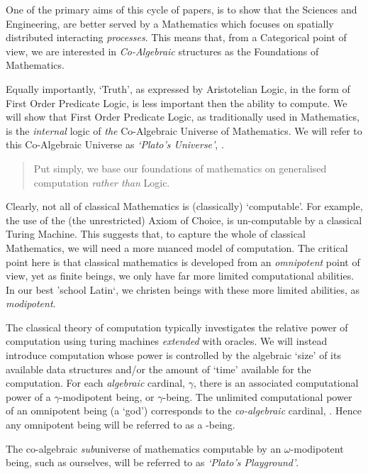 \documentclass[a4paper,openany]{amsbook}
\newenvironment{myQuote}{\begin{quotation}}{\end{quotation}}
\begin{document}
One of the primary aims of this cycle of papers, is to show that the Sciences
and Engineering, are better served by a Mathematics which focuses on spatially
distributed interacting \emph{processes}. This means that, from a Categorical
point of view, we are interested in \emph{Co-Algebraic} structures as the
Foundations of Mathematics.

Equally importantly, `Truth', as expressed by Aristotelian Logic, in the form of
First Order Predicate Logic, is less important then the ability to compute. We
will show that First Order Predicate Logic, as traditionally used in
Mathematics, is the \emph{internal} logic of \emph{the} Co-Algebraic Universe of
Mathematics. We will refer to this Co-Algebraic Universe as \emph{`Plato's
Universe'}, \Universe{}{}.

\begin{myQuote}
Put simply, we base our foundations of mathematics on generalised
computation \emph{rather than} Logic.
\end{myQuote}

Clearly, not all of classical Mathematics is (classically) `computable'. For
example, the use of the (the unrestricted) Axiom of Choice, is un-computable by
a classical Turing Machine. This suggests that, to capture the whole of
classical Mathematics, we will need a more nuanced model of computation. The
critical point here is that classical mathematics is developed from an
\emph{omnipotent} point of view, yet as finite beings, we only have far more
limited computational abilities. In our best 'school Latin`, we christen beings
with these more limited abilities, as \emph{modipotent}.

The classical theory of computation typically investigates the relative power of
computation using turing machines \emph{extended} with oracles. We will instead introduce
computation whose power is controlled by the algebraic `size' of its available data
structures and/or the amount of `time' available for the computation. For each
\emph{algebraic} cardinal, $\gamma$, there is an associated computational power of a
$\gamma$-modipotent being, or $\gamma$-being. The unlimited computational power of an
omnipotent being (a `god') corresponds to the \emph{co-algebraic} cardinal, \Cardinal.
Hence any omnipotent being will be referred to as a \Cardinal-being.

The co-algebraic \emph{sub}universe of mathematics computable by an
$\omega$-modipotent being, such as ourselves, will be referred to as
\emph{`Plato's Playground'}.
\end{document}
